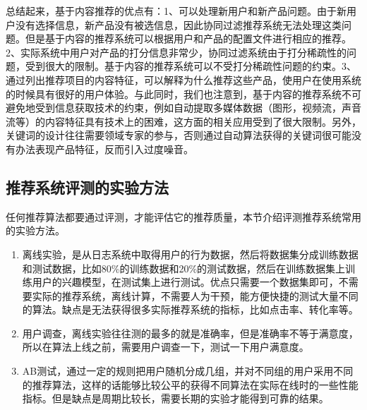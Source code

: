 \begin{enumerate}[(1)]
	总结起来，基于内容推荐的优点有：1、可以处理新用户和新产品问题。由于新用户没有选择信息，新产品没有被选信息，因此协同过滤推荐系统无法处理这类问题。但是基于内容的推荐系统可以根据用户和产品的配置文件进行相应的推荐。2、实际系统中用户对产品的打分信息非常少，协同过滤系统由于打分稀疏性的问题，受到很大的限制。基于内容的推荐系统可以不受打分稀疏性问题的约束。3、通过列出推荐项目的内容特征，可以解释为什么推荐这些产品，使用户在使用系统的时候具有很好的用户体验。与此同时，我们也注意到，基于内容的推荐系统不可避免地受到信息获取技术的约束，例如自动提取多媒体数据（图形，视频流，声音流等）的内容特征具有技术上的困难，这方面的相关应用受到了很大限制。另外，关键词的设计往往需要领域专家的参与，否则通过自动算法获得的关键词很可能没有办法表现产品特征，反而引入过度噪音。
	\end{enumerate}

	\subsection{推荐系统评测的实验方法}
	任何推荐算法都要通过评测，才能评估它的推荐质量，本节介绍评测推荐系统常用的实验方法。
		\begin{enumerate}[(1)]
		\item 离线实验，是从日志系统中取得用户的行为数据，然后将数据集分成训练数据和测试数据，比如80\%的训练数据和20\%的测试数据，然后在训练数据集上训练用户的兴趣模型，在测试集上进行测试。优点只需要一个数据集即可，不需要实际的推荐系统，离线计算，不需要人为干预，能方便快捷的测试大量不同的算法。缺点是无法获得很多实际推荐系统的指标，比如点击率、转化率等。
		\item 用户调查，离线实验往往测的最多的就是准确率，但是准确率不等于满意度，所以在算法上线之前，需要用户调查一下，测试一下用户满意度。
		\item AB测试，通过一定的规则把用户随机分成几组，并对不同组的用户采用不同的推荐算法，这样的话能够比较公平的获得不同算法在实际在线时的一些性能指标。但是缺点是周期比较长，需要长期的实验才能得到可靠的结果。
		\end{enumerate}
